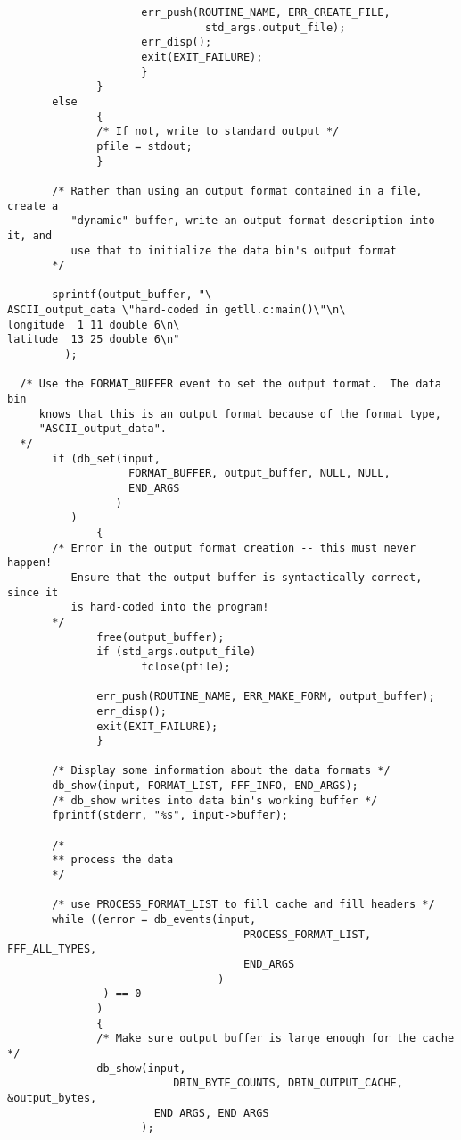 \begin{verbatim}
                     err_push(ROUTINE_NAME, ERR_CREATE_FILE, 
                               std_args.output_file);
                     err_disp();
                     exit(EXIT_FAILURE);
                     }
              }
       else
              {
              /* If not, write to standard output */
              pfile = stdout;
              }
                     
       /* Rather than using an output format contained in a file, create a
          "dynamic" buffer, write an output format description into it, and
          use that to initialize the data bin's output format
       */
     
       sprintf(output_buffer, "\
ASCII_output_data \"hard-coded in getll.c:main()\"\n\
longitude  1 11 double 6\n\
latitude  13 25 double 6\n"
         );
         
  /* Use the FORMAT_BUFFER event to set the output format.  The data bin
     knows that this is an output format because of the format type,
     "ASCII_output_data".
  */
       if (db_set(input,
                   FORMAT_BUFFER, output_buffer, NULL, NULL,
                   END_ARGS
                 )
          )
              {
       /* Error in the output format creation -- this must never happen!
          Ensure that the output buffer is syntactically correct, since it
          is hard-coded into the program!
       */
              free(output_buffer);
              if (std_args.output_file)
                     fclose(pfile);

              err_push(ROUTINE_NAME, ERR_MAKE_FORM, output_buffer);
              err_disp();
              exit(EXIT_FAILURE);
              }
       
       /* Display some information about the data formats */
       db_show(input, FORMAT_LIST, FFF_INFO, END_ARGS);
       /* db_show writes into data bin's working buffer */
       fprintf(stderr, "%s", input->buffer);

       /*
       ** process the data
       */
     
       /* use PROCESS_FORMAT_LIST to fill cache and fill headers */
       while ((error = db_events(input,
                                     PROCESS_FORMAT_LIST, FFF_ALL_TYPES,
                                     END_ARGS
                                 )
               ) == 0
              )
              {
              /* Make sure output buffer is large enough for the cache */
              db_show(input, 
                          DBIN_BYTE_COUNTS, DBIN_OUTPUT_CACHE, &output_bytes, 
                       END_ARGS, END_ARGS
                     );


\end{verbatim}
